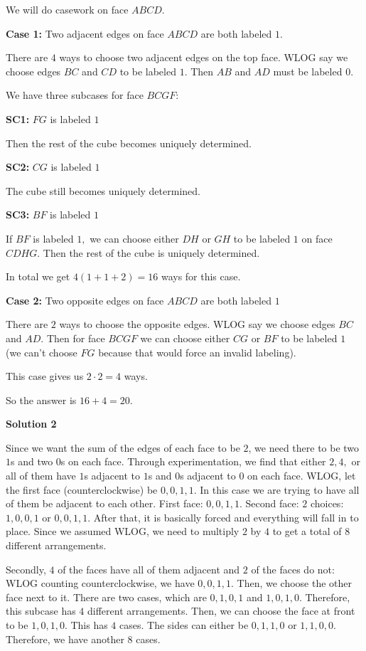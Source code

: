 \begin{enumerate}
 We will do casework on face $ABCD.$ 

 \textbf{Case 1:} Two adjacent edges on face $ABCD$ are both labeled $1$. 

 There are $4$ ways to choose two adjacent edges on the top face. WLOG say we choose edges $BC$ and $CD$ to be labeled $1.$ Then $AB$ and $AD$ must be labeled $0.$ 

 We have three subcases for face $BCGF:$ 

 \textbf{SC1:} $FG$ is labeled $1$ 

 Then the rest of the cube becomes uniquely determined.

 \textbf{SC2:} $CG$ is labeled $1$ 

 The cube still becomes uniquely determined.

 \textbf{SC3:} $BF$ is labeled $1$ 

 If $BF$ is labeled $1,$ we can choose either $DH$ or $GH$ to be labeled $1$ on face $CDHG.$ Then the rest of the cube is uniquely determined. 

 In total we get $4(1 + 1 + 2) = 16$ ways for this case. 

 \textbf{Case 2:} Two opposite edges on face $ABCD$ are both labeled $1$ 

 There are $2$ ways to choose the opposite edges. WLOG say we choose edges $BC$ and $AD.$ Then for face $BCGF$ we can choose either $CG$ or $BF$ to be labeled $1$ (we can't choose $FG$ because that would force an invalid labeling). 

 This case gives us $2 \cdot 2 = 4$ ways. 

 So the answer is $16 + 4 = \boxed{20}.$




\textbf{Solution 2}

Since we want the sum of the edges of each face to be $2$, we need there to be two $1$s and two $0$s on each face. Through experimentation, we find that either $2, 4,$ or all of them have $1$s adjacent to $1$s and $0$s adjacent to $0$ on each face. WLOG, let the first face (counterclockwise) be $0,0,1,1$. In this case we are trying to have all of them be adjacent to each other. First face: $0,0,1,1$. Second face: $2$ choices: $1,0,0,1$ or $0,0,1,1$. After that, it is basically forced and everything will fall in to place. Since we assumed WLOG, we need to multiply $2$ by $4$ to get a total of $8$ different arrangements. 

 Secondly, $4$ of the faces have all of them adjacent and $2$ of the faces do not: WLOG counting counterclockwise, we have $0,0,1,1$. Then, we choose the other face next to it. There are two cases, which are $0,1,0,1$ and $1,0,1,0$. Therefore, this subcase has $4$ different arrangements. Then, we can choose the face at front to be $1,0,1,0$. This has $4$ cases. The sides can either be $0,1,1,0$ or $1,1,0,0$. Therefore, we have another $8$ cases.


\end{enumerate}
